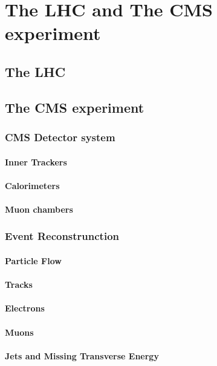 \chapter{The LHC and The CMS experiment}

\section{The LHC}

\section{The CMS experiment}

\subsection{CMS Detector system}
\subsubsection{Inner Trackers}
\subsubsection{Calorimeters}
\subsubsection{Muon chambers}

\subsection{Event Reconstrunction}
\subsubsection{Particle Flow}
\subsubsection{Tracks}
\subsubsection{Electrons}
\subsubsection{Muons}
\subsubsection{Jets and Missing Transverse Energy}
